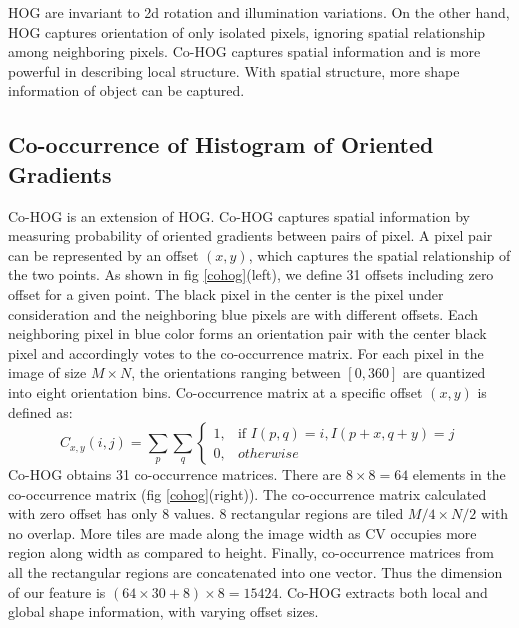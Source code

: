 HOG are invariant to 2d rotation and illumination variations. On the other hand, HOG captures orientation of only isolated pixels, ignoring spatial relationship among neighboring pixels. Co-HOG captures spatial information and is more powerful in describing local structure. With spatial structure, more shape information of object can be captured.

\subsection{Co-occurrence of Histogram of Oriented Gradients}
Co-HOG is an extension of HOG. Co-HOG captures spatial information by measuring probability of oriented gradients between pairs of pixel. A pixel pair can be represented by an offset $(x, y)$, which captures the spatial relationship of the two points. As shown in fig \ref{cohog}(left), we define 31 offsets including zero offset for a given point. The black pixel in the center is the pixel under consideration and the neighboring blue pixels are with different offsets. Each neighboring pixel in blue color forms an orientation pair with the center black pixel and accordingly votes to the co-occurrence matrix. For each pixel in the image of size $M \times N$, the orientations ranging between $[0, 360]$ are quantized into eight orientation bins. Co-occurrence matrix at a specific offset $(x, y)$ is defined as:
			\small
			\begin{equation}\label{eq:cohog}
				C_{x,y}(i, j) = \sum_{p}\sum_{q}\begin{cases} 1, & \mbox{if } I(p, q) = i, I(p + x, q + y) = j\\ 
				0, &  otherwise \end{cases} 
				\end{equation} 
				\normalsize 
Co-HOG obtains 31 co-occurrence matrices. There are $8 \times 8 = 64$ elements in the co-occurrence matrix (fig \ref{cohog}(right)). The co-occurrence matrix calculated with zero offset has only 8 values. 8 rectangular regions are tiled $M/4 \times N/2$ with no overlap. More tiles are made along the image width as CV occupies more region along width as compared to height. Finally, co-occurrence matrices from all the rectangular regions are concatenated into one vector. Thus the dimension of our feature is $(64 \times 30 + 8) \times 8 = 15424$. Co-HOG extracts both local and global shape information, with varying offset sizes. 

